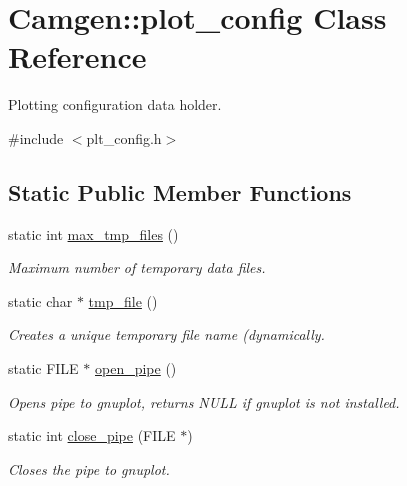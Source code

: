 \hypertarget{a00422}{\section{Camgen\-:\-:plot\-\_\-config Class Reference}
\label{a00422}
}


Plotting configuration data holder.  




{\ttfamily \#include $<$plt\-\_\-config.\-h$>$}

\subsection*{Static Public Member Functions}
\begin{DoxyCompactItemize}
\item 
\hypertarget{a00422_a615c3c7b8bbecddcda4436a08dd4e301}{static int \hyperlink{a00422_a615c3c7b8bbecddcda4436a08dd4e301}{max\-\_\-tmp\-\_\-files} ()}\label{a00422_a615c3c7b8bbecddcda4436a08dd4e301}

\begin{DoxyCompactList}\small\item\em Maximum number of temporary data files. \end{DoxyCompactList}\item 
\hypertarget{a00422_a20dc2a981b98297089f04adc72d12c7e}{static char $\ast$ \hyperlink{a00422_a20dc2a981b98297089f04adc72d12c7e}{tmp\-\_\-file} ()}\label{a00422_a20dc2a981b98297089f04adc72d12c7e}

\begin{DoxyCompactList}\small\item\em Creates a unique temporary file name (dynamically. \end{DoxyCompactList}\item 
\hypertarget{a00422_af5aec1edd57c037a5573467c4c1a9a97}{static F\-I\-L\-E $\ast$ \hyperlink{a00422_af5aec1edd57c037a5573467c4c1a9a97}{open\-\_\-pipe} ()}\label{a00422_af5aec1edd57c037a5573467c4c1a9a97}

\begin{DoxyCompactList}\small\item\em Opens pipe to gnuplot, returns N\-U\-L\-L if gnuplot is not installed. \end{DoxyCompactList}\item 
\hypertarget{a00422_abb6c7f63db9af2c39be1e3bd317e4ef8}{static int \hyperlink{a00422_abb6c7f63db9af2c39be1e3bd317e4ef8}{close\-\_\-pipe} (F\-I\-L\-E $\ast$)}\label{a00422_abb6c7f63db9af2c39be1e3bd317e4ef8}

\begin{DoxyCompactList}\small\item\em Closes the pipe to gnuplot. \end{DoxyCompactList}\end{DoxyCompactItemize}

